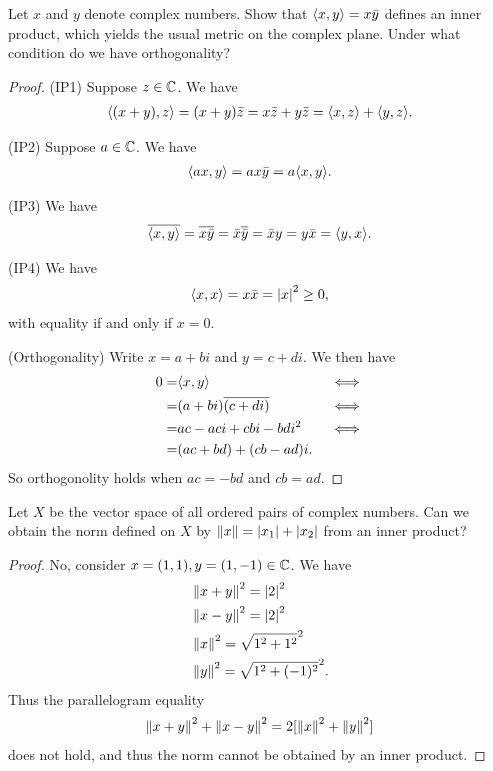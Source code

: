 \begin{exercise}{10}
Let $x$ and $y$ denote complex numbers.
Show that $\langle x,y\rangle = x\bar{y}$ defines an inner product, which yields the usual metric on the complex plane.
Under what condition do we have orthogonality?
\end{exercise}
\begin{proof}
(IP1)
Suppose $z\in\mathbb{C}$.
We have 
\begin{align*}
    \langle (x+y),z\rangle
    = (x+y)\bar{z}
    = x\bar{z} + y\bar{z}
    = \langle x,z\rangle + \langle y,z\rangle.
\end{align*}

(IP2)
Suppose $a\in\mathbb{C}$.
We have
\begin{align*}
    \langle ax,y\rangle
    = ax\bar{y}
    = a\langle x,y\rangle.
\end{align*}

(IP3)
We have
\begin{align*}
    \overline{\langle x,y\rangle}
    = \overline{x\bar{y}}
    = \bar{x}\overline{\bar{y}}
    = \bar{x}y
    = y\bar{x}
    = \langle y,x\rangle.
\end{align*}

(IP4)
We have
\begin{align*}
    \langle x,x\rangle
    = x\bar{x}
    = \left\lvert x\right\rvert^2 \geq 0,
\end{align*}
with equality if and only if $x=0$.

(Orthogonality)
Write $x=a+bi$ and $y=c+di$.
We then have
\begin{align*}
    0
    =& \langle x,y\rangle && \iff\\
    =& (a+bi)\overline{(c+di)} &&\iff\\
    =& ac - aci + cbi - bdi^2 &&\iff\\
    =& (ac+bd) + (cb-ad)i.
\end{align*}
So orthogonolity holds when $ac=-bd$ and $cb=ad$.
\end{proof}

\begin{exercise}{11}
Let $X$ be the vector space of all ordered pairs of complex numbers.
Can we obtain the norm defined on $X$ by $\left\lVert x\right\rVert =\left\lvert x_1\right\rvert+\left\lvert x_2\right\rvert$ from an inner product?
\end{exercise}
\begin{proof}
No, consider $x =(1,1), y=(1,-1) \in\mathbb{C}$.
We have
\begin{align*}
    &\left\lVert x+y\right\rVert^2 = \left\lvert 2\right\rvert^2\\
    &\left\lVert x-y\right\rVert^2 = \left\lvert 2\right\rvert^2\\
    &\left\lVert x\right\rVert^2 = \sqrt{1^2+1^2}^2\\
    &\left\lVert y\right\rVert^2 = \sqrt{1^2+(-1)^2}^2.
\end{align*}
Thus the parallelogram equality
\begin{align*}
    \left\lVert x+y\right\rVert^2 + \left\lVert x-y\right\rVert^2 = 
    2[\left\lVert x\right\rVert^2 + \left\lVert y\right\rVert^2]
\end{align*}
does not hold, and thus the norm cannot be obtained by an inner product.
\end{proof}

